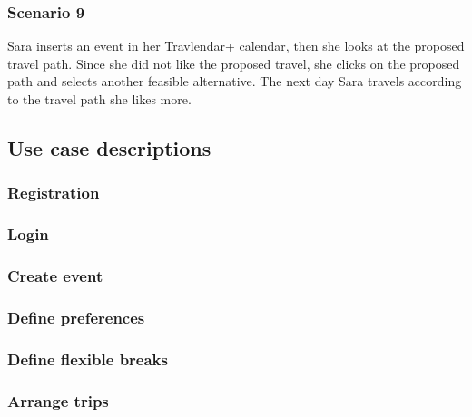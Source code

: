 	\subsubsection{Scenario 9}
		Sara inserts an event in her Travlendar+ calendar, then she looks at the proposed travel path. Since she did not like the proposed travel, she clicks on the proposed path and selects another feasible alternative. The next day Sara travels according to the travel path she likes more.	
	
\subsection{Use case descriptions}
\label{subsect:Use case descriptions}

	\subsubsection{Registration}
		
		
	\subsubsection{Login}
		
		
	\subsubsection{Create event}
		
		
	\subsubsection{Define preferences}
		
		
	\subsubsection{Define flexible breaks}
			
		
	\subsubsection{Arrange trips}
			
		
